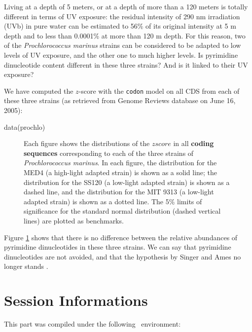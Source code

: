 \documentclass{article}
\begin{document}
Living at a depth of 5 meters, or at a depth of more than a 120 meters
is totally different in terms of UV exposure: the residual intensity
of 290 nm irradiation (UVb) in pure water can be estimated to 56\% of
its original intensity at 5 m depth and to less than 0.0001\% at more
than 120 m depth. For this reason, two of the \textit{Prochlorococcus
marinus} strains can be considered to be adapted to low levels of UV
exposure, and the other one to much higher levels. Is pyrimidine
dinucleotide content different in these three strains? And is it
linked to their UV exposure?

We have computed the $z$-score with the \texttt{codon} model on
all CDS from each of these three strains (as retrieved from Genome
Reviews database on June 16, 2005):

\begin{Schunk}
\begin{Sinput}
 data(prochlo)
\end{Sinput}
\end{Schunk}


\begin{figure}[H]
   \begin{center}
\end{center}
   \caption{Each figure shows the distributions of the $zscore$ in all
     \textbf{coding sequences} corresponding to each of the three
     strains of \textit{Prochlorococcus marinus}. In each figure, the
     distribution for the MED4 (a high-light adapted strain) is shown
     as a solid line; the distribution for the SS120 (a low-light
     adapted strain) is shown as a dashed line, and the distribution
     for the MIT 9313 (a low-light adapted strain) is shown as a
     dotted line. The 5\% limits of significance for the standard
     normal distribution (dashed vertical lines) are plotted as
     benchmarks.}
\label{prochlo}
\end{figure}

Figure \ref{prochlo} shows that there is no difference between the
relative abundances of pyrimidine dinucleotides in these three
strains. We can say that pyrimidine dinucleotides are not avoided, and
that the hypothesis by Singer and Ames \cite{Singer} no longer stands
\cite{UV}.


\section*{Session Informations}

This part was compiled under the following \Rlogo{}~environment:
\end{document}
